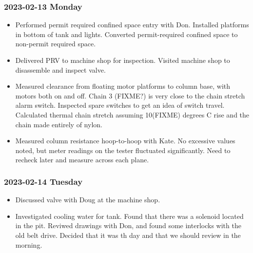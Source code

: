 \documentclass{scrartcl}
\begin{document}
\subsubsection{2023-02-13 Monday}
\begin{itemize}
	\item Performed permit required confined space entry with Don.  Installed platforms in bottom of tank and lights.  
	Converted permit-required confined space to non-permit required space.
	\item Delivered PRV to machine shop for inspection.  Visited machine
	shop to disassemble and inspect valve.  
	\item Measured clearance from floating motor platforms to column base, with motors both on and off.  Chain 3 (FIXME?)
	is very close to the chain stretch alarm switch.  Inspected spare 
	switches to get an idea of switch travel.  Calculated thermal chain 
	stretch assuming 10(FIXME) degrees C rise and the chain made entirely
	of nylon.
	\item Measured column resistance hoop-to-hoop with Kate.  No excessive 
	values noted, but meter readings on the tester fluctuated significantly.
	Need to recheck later and measure across each plane.
\end{itemize}

\subsubsection{2023-02-14 Tuesday}
\begin{itemize}
    \item Discussed valve with Doug at the machine shop.
    \item Investigated cooling water for tank.  Found that there was a
    solenoid located in the pit.  Reviwed drawings with Don, and found 
	some interlocks with the old belt drive.  Decided that it was th
	day and that we should review in the morning.
\end{itemize}
\end{document}
